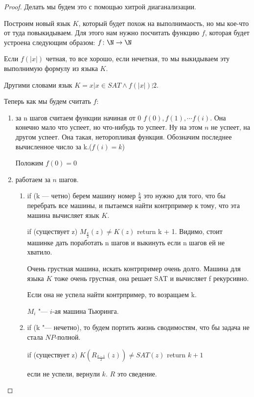 \begin{proof}
	Делать мы будем это с помощью хитрой диаганализации.

	Построим новый язык $K$, который будет похож на выполнимаость, но мы кое-что от туда повыкидываем. 
	Для этого нам нужно посчитать функцию $f$, которая будет устроена следующим образом:
	$f \colon \N \to \N$  

	Если $f(|x|)$ четная, то все хорошо, если нечетная, то мы выкидываем эту выполнимую формулу из языка $K$.

	Другими словами язык $K = {x | x \in SAT \wedge f(|x|) \vdots 2}$.

	Теперь как мы будем считать $f$:
	\begin{enumerate}
    	\item за n шагов считаем функции начиная от 0 $f(0), f(1), \cdots f(i)$. 
    	Она конечно мало что успеет, но что-нибудь то успеет. Ну на этом $n$ не 
    	успеет, на другом успеет. Она такая, неторопливая функция. Обозначим 
    	последнее вычисленное число за k.($f(i) = k$)
    
    	Положим $f(0) = 0$\\
    	\item работаем за $n$ шагов. 
    	\begin{enumerate}
    		\item if (k --- четно) берем машину номер $\frac{k}{2}$ это нужно для 
    		того, что бы перебрать все машины, и пытаемся найти контрпример к тому, 
    		что эта машина вычисляет язык $K$. 
    		
    		if (существует z) $M_{\frac{k}{2}}(z) \ne K(z)$  return k + 1. 
    		Видимо, стоит машинке дать поработать n шагов и выкинуть если n шагов ей не хватило. 


    	    	Очень грустная машина, искать контрпример очень долго. Машина для языка $K$ тоже 
    		очень грустная, она решает SAT и вычисляет f рекурсивно. 

    		Если она не успела найти контрпример, то возращаем k. 
    
    		$M_i$ "--- $i$-ая машина Тьюринга. 
    		\item if (k "--- нечетно), то будем портить  жизнь сводимостям, что бы задача не стала $NP$-полной. 

    		if (существует z) $K(R_{\frac{k - 1}{2}}(z)) \ne SAT(z)$ return $k + 1$
    		
    		если не успели, вернули $k$. $R$ это сведение. 
    	\end{enumerate} 
	\end{enumerate}


\end{proof}
